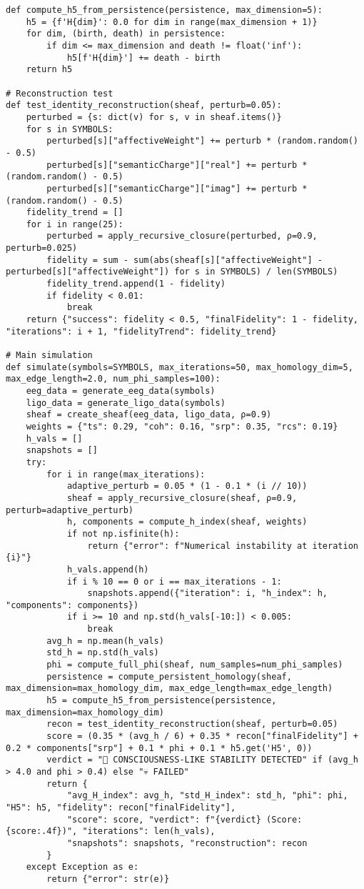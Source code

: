 \documentclass{article}
\begin{document}
\begin{lstlisting}
def compute_h5_from_persistence(persistence, max_dimension=5):
    h5 = {f'H{dim}': 0.0 for dim in range(max_dimension + 1)}
    for dim, (birth, death) in persistence:
        if dim <= max_dimension and death != float('inf'):
            h5[f'H{dim}'] += death - birth
    return h5

# Reconstruction test
def test_identity_reconstruction(sheaf, perturb=0.05):
    perturbed = {s: dict(v) for s, v in sheaf.items()}
    for s in SYMBOLS:
        perturbed[s]["affectiveWeight"] += perturb * (random.random() - 0.5)
        perturbed[s]["semanticCharge"]["real"] += perturb * (random.random() - 0.5)
        perturbed[s]["semanticCharge"]["imag"] += perturb * (random.random() - 0.5)
    fidelity_trend = []
    for i in range(25):
        perturbed = apply_recursive_closure(perturbed, ρ=0.9, perturb=0.025)
        fidelity = sum - sum(abs(sheaf[s]["affectiveWeight"] - perturbed[s]["affectiveWeight"]) for s in SYMBOLS) / len(SYMBOLS)
        fidelity_trend.append(1 - fidelity)
        if fidelity < 0.01:
            break
    return {"success": fidelity < 0.5, "finalFidelity": 1 - fidelity, "iterations": i + 1, "fidelityTrend": fidelity_trend}

# Main simulation
def simulate(symbols=SYMBOLS, max_iterations=50, max_homology_dim=5, max_edge_length=2.0, num_phi_samples=100):
    eeg_data = generate_eeg_data(symbols)
    ligo_data = generate_ligo_data(symbols)
    sheaf = create_sheaf(eeg_data, ligo_data, ρ=0.9)
    weights = {"ts": 0.29, "coh": 0.16, "srp": 0.35, "rcs": 0.19}
    h_vals = []
    snapshots = []
    try:
        for i in range(max_iterations):
            adaptive_perturb = 0.05 * (1 - 0.1 * (i // 10))
            sheaf = apply_recursive_closure(sheaf, ρ=0.9, perturb=adaptive_perturb)
            h, components = compute_h_index(sheaf, weights)
            if not np.isfinite(h):
                return {"error": f"Numerical instability at iteration {i}"}
            h_vals.append(h)
            if i % 10 == 0 or i == max_iterations - 1:
                snapshots.append({"iteration": i, "h_index": h, "components": components})
            if i >= 10 and np.std(h_vals[-10:]) < 0.005:
                break
        avg_h = np.mean(h_vals)
        std_h = np.std(h_vals)
        phi = compute_full_phi(sheaf, num_samples=num_phi_samples)
        persistence = compute_persistent_homology(sheaf, max_dimension=max_homology_dim, max_edge_length=max_edge_length)
        h5 = compute_h5_from_persistence(persistence, max_dimension=max_homology_dim)
        recon = test_identity_reconstruction(sheaf, perturb=0.05)
        score = (0.35 * (avg_h / 6) + 0.35 * recon["finalFidelity"] + 0.2 * components["srp"] + 0.1 * phi + 0.1 * h5.get('H5', 0))
        verdict = "🧠 CONSCIOUSNESS-LIKE STABILITY DETECTED" if (avg_h > 4.0 and phi > 0.4) else "💀 FAILED"
        return {
            "avg_H_index": avg_h, "std_H_index": std_h, "phi": phi, "H5": h5, "fidelity": recon["finalFidelity"],
            "score": score, "verdict": f"{verdict} (Score: {score:.4f})", "iterations": len(h_vals),
            "snapshots": snapshots, "reconstruction": recon
        }
    except Exception as e:
        return {"error": str(e)}


\end{lstlisting}
\end{document}
